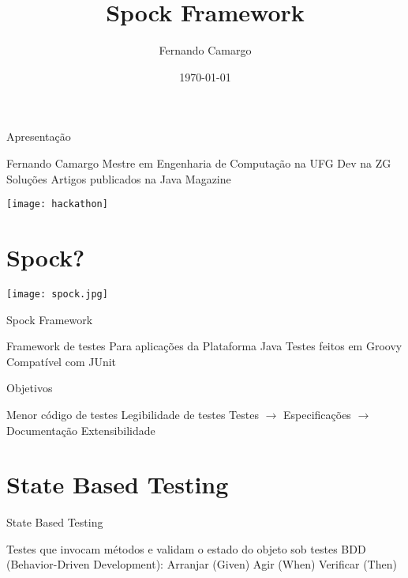 \documentclass{beamer}
\title{Spock Framework}
\date{\today}
\author{Fernando Camargo}
\institute{ZG Soluções}
\begin{document}
\maketitle

\begin{frame}{Apresentação}
 \begin{outline}
   \1 Fernando Camargo
   \1 Mestre em Engenharia de Computação na UFG
   \1 Dev na ZG Soluções
   \1 Artigos publicados na Java Magazine
 \end{outline}
\end{frame}

\begin{frame}
  \begin{center}
    \texttt{[image: hackathon]}
  \end{center}
\end{frame}

\section{Spock?}

\begin{frame}
  \begin{center}
    \texttt{[image: spock.jpg]}
  \end{center}
\end{frame}

\begin{frame}{Spock Framework}
 \begin{outline}
    Framework de testes
    Para aplicações da Plataforma Java
    Testes feitos em Groovy
    Compatível com JUnit
 \end{outline}
\end{frame}

\begin{frame}{Objetivos}
 \begin{outline}
    Menor código de testes
    Legibilidade de testes
    Testes $\rightarrow$ Especificações $\rightarrow$ Documentação
    Extensibilidade
 \end{outline}
\end{frame}

\section{State Based Testing}

\begin{frame}{State Based Testing}
 \begin{outline}
    Testes que invocam métodos e validam o estado do objeto sob testes
    BDD (Behavior-Driven Development):
     Arranjar (Given)
     Agir (When)
     Verificar (Then)
 \end{outline}
\end{frame}
\end{document}

